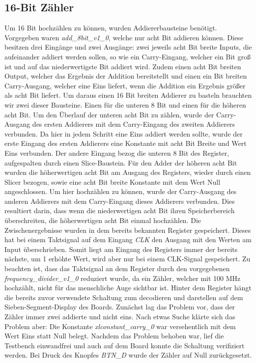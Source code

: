 \documentclass[11pt, a4paper]{article}
\begin{document}
\subsection*{16-Bit Zähler}
Um 16 Bit hochzählen zu können, wurden Addiererbausteine benötigt.
Vorgegeben waren \textit{add\_8bit\_v1\_0}, welche nur acht Bit addieren können. 
Diese besitzen drei Eingänge und zwei Ausgänge: zwei jeweils acht Bit breite Inputs, die aufeinander addiert werden sollen, so wie ein Carry-Eingang, welcher ein Bit groß ist und auf das niederwertigste Bit addiert wird. Zudem einen acht Bit breiten Output, welcher das Ergebnis der Addition bereitstellt und einen ein Bit breiten Carry-Ausgang, welcher eine Eins liefert, wenn die Addition ein Ergebnis größer als acht Bit liefert.
\newline
Um daraus einen 16 Bit breiten Addierer zu basteln brauchten wir zwei dieser Bausteine. Einen für die unteren 8 Bit und einen für die höheren acht Bit.
Um den Überlauf der unteren acht Bit zu zählen, wurde der Carry-Ausgang des ersten Addierers mit dem Carry-Eingang des zweiten Addierers verbunden.
Da hier in jedem Schritt eine Eins addiert werden sollte, wurde der erste Eingang des ersten Addierers eine Konstante mit acht Bit Breite und Wert Eins verbunden.
Der andere Eingang bezog die unteren 8 Bit des Register, aufgespalten durch einen Slice-Baustein.
\newline
Für den Adder der höheren acht Bit wurden die höherwertigen acht Bit am Ausgang des Registers, wieder durch einen Slicer bezogen, sowie eine acht Bit breite Konstante mit dem Wert Null angeschlossen.
Um hier hochzählen zu können, wurde der Carry-Ausgang des anderen Addierers mit dem Carry-Eingang dieses Addierers verbunden.
Dies resultiert darin, dass wenn die niederwertigen acht Bit ihren Speicherbereich überschreiten, die höherwertigen acht Bit einmal hochzählen.
\newline
Die Zwischenergebnisse wurden in dem bereits bekannten Register gespeichert. Dieses hat bei einem Taktsignal auf dem Eingang \textit{CLK} den Ausgang mit den Werten am Input überschrieben. Somit liegt am Eingang des Registers immer der bereits nächste, um 1 erhöhte Wert, wird aber nur bei einem CLK-Signal gespeichert.
Zu beachten ist, dass das Taktsignal an dem Register durch den vorgegebenen \textit{frequency\_divider\_v1\_0} reduziert wurde, da ein Zähler, welcher mit 100 MHz hochzählt, nicht für das menschliche Auge sichtbar ist.
\newline
Hinter dem Register hängt die bereits zuvor verwendete Schaltung zum decodieren und darstellen auf dem Sieben-Segment-Display des Boards.
\newline
Zunächst lag das Problem vor, dass der Zähler immer zwei addierte und nicht eins. Nach etwas Suche klärte sich das Problem aber: Die Konstante \textit{xlconstant\_carry\_0} war versehentlich mit dem Wert Eins statt Null belegt.
Nachdem das Problem behoben war, lief die Testbench einwandfrei und auch auf dem Board konnte die Schaltung verifiziert werden. Bei Druck des Knopfes \textit{BTN\_D} wurde der Zähler auf Null zurückgesetzt.
\end{document}
